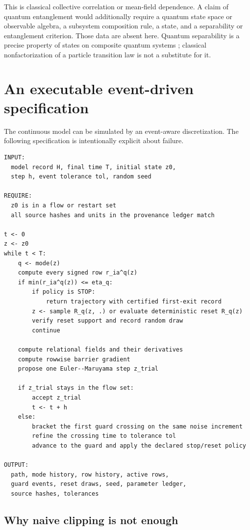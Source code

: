\documentclass[11pt]{article}
\theoremstyle{definition}
\theoremstyle{remark}
\begin{document}
This is classical collective correlation or mean-field dependence.  A
claim of quantum entanglement would additionally require a quantum state
space or observable algebra, a subsystem composition rule, a state, and a
separability or entanglement criterion.  Those data are absent here.
Quantum separability is a precise property of states on composite quantum
systems \cite{Werner1989,HorodeckiEtAl2009}; classical nonfactorization of a
particle transition law is not a substitute for it.

\section{An executable event-driven specification}
\label{sec:algorithm}

The continuous model can be simulated by an event-aware discretization.
The following specification is intentionally explicit about failure.

\begin{verbatim}
INPUT:
  model record H, final time T, initial state z0,
  step h, event tolerance tol, random seed

REQUIRE:
  z0 is in a flow or restart set
  all source hashes and units in the provenance ledger match

t <- 0
z <- z0
while t < T:
    q <- mode(z)
    compute every signed row r_ia^q(z)
    if min(r_ia^q(z)) <= eta_q:
        if policy is STOP:
            return trajectory with certified first-exit record
        z <- sample R_q(z, .) or evaluate deterministic reset R_q(z)
        verify reset support and record random draw
        continue

    compute relational fields and their derivatives
    compute rowwise barrier gradient
    propose one Euler--Maruyama step z_trial

    if z_trial stays in the flow set:
        accept z_trial
        t <- t + h
    else:
        bracket the first guard crossing on the same noise increment
        refine the crossing time to tolerance tol
        advance to the guard and apply the declared stop/reset policy

OUTPUT:
  path, mode history, row history, active rows,
  guard events, reset draws, seed, parameter ledger,
  source hashes, tolerances
\end{verbatim}

\subsection{Why naive clipping is not enough}
\end{document}
